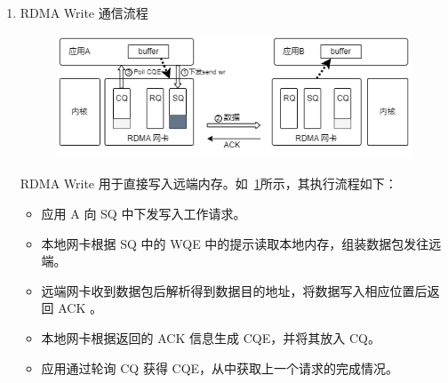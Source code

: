 {\begin{enumerate}[label=\arabic*.]
    RDMA Read 用于直接读取远端内存。如~\ref{fig:rdma-Read}所示，其执行流程如下：
    \begin{itemize}
        \item 应用 A 向 SQ 中下发读取工作请求。
        \item 本地网卡根据 SQ 中的 WQE 向远端发送读取请求包。
        \item 远端网卡接收到读取请求包后，根据包中携带的信息，读取应用 B 相应位置的内存，并发回数据。
        \item 本地网卡接收到数据，根据 WQE 的信息将数据存入应用 A 的内存，并向 CQ 中存入CQE。
        \item 应用通过轮询 CQ 获得 CQE，从中获取上一个请求的完成情况。 
    \end{itemize}

    \item RDMA Write 通信流程
        \begin{figure}[!htbp]
            \centering
            \includegraphics[width=\linewidth]{Img/RDMA-Write.png}
            \label{fig:rdma-Write}
        \end{figure}
        
    RDMA Write 用于直接写入远端内存。如~\ref{fig:rdma-Write}所示，其执行流程如下：
    \begin{itemize}
        \item 应用 A 向 SQ 中下发写入工作请求。
        \item 本地网卡根据 SQ 中的 WQE 中的提示读取本地内存，组装数据包发往远端。
        \item 远端网卡收到数据包后解析得到数据目的地址，将数据写入相应位置后返回 ACK 。
        \item 本地网卡根据返回的 ACK 信息生成 CQE，并将其放入 CQ。
        \item 应用通过轮询 CQ 获得 CQE，从中获取上一个请求的完成情况。 
    \end{itemize}
\end{enumerate}

}
